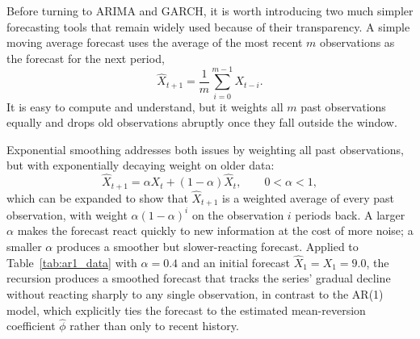 \documentclass[../ai_in_finance]{subfiles}
\begin{document}
Before turning to ARIMA and GARCH, it is worth introducing two much simpler forecasting tools that remain widely used because of their transparency. A simple moving average forecast uses the average of the most recent $m$ observations as the forecast for the next period,
\begin{equation*}
\hat X_{t+1} = \frac{1}{m}\sum_{i=0}^{m-1} X_{t-i}.
\end{equation*}
It is easy to compute and understand, but it weights all $m$ past observations equally and drops old observations abruptly once they fall outside the window.

Exponential smoothing addresses both issues by weighting all past observations, but with exponentially decaying weight on older data:
\begin{equation*}
\hat X_{t+1} = \alpha X_t + (1-\alpha)\hat X_t, \qquad 0 < \alpha < 1,
\end{equation*}
which can be expanded to show that $\hat X_{t+1}$ is a weighted average of every past observation, with weight $\alpha(1-\alpha)^i$ on the observation $i$ periods back.
A larger $\alpha$ makes the forecast react quickly to new information at the cost of more noise; a smaller $\alpha$ produces a smoother but slower-reacting forecast. Applied to Table~\ref{tab:ar1_data} with $\alpha = 0.4$ and an initial forecast $\hat X_1 = X_1 = 9.0$, the recursion produces a smoothed forecast that tracks the series' gradual decline without reacting sharply to any single observation, in contrast to the AR(1) model, which explicitly ties the forecast to the estimated mean-reversion coefficient $\hat\phi$ rather than only to recent history.
\end{document}
